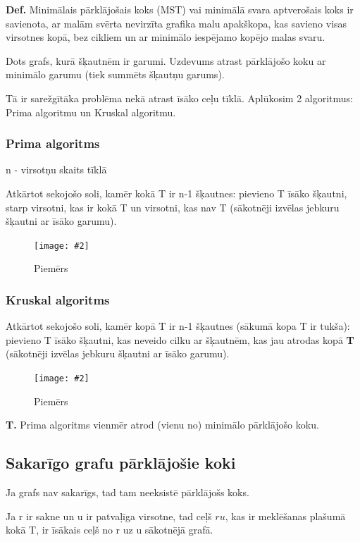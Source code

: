 \documentclass{article}
\newcommand{\illustration}[3]{
	\begin{figure}[H]
		\centering	
		\texttt{[image: \#2]}
		\caption{#3}
	\end{figure}
}
\begin{document}
\textbf{Def.} Minimālais pārklājošais koks (MST) vai minimālā svara aptverošais koks ir savienota, ar malām svērta nevirzīta grafika malu apakškopa, kas savieno visas virsotnes kopā, bez cikliem un ar minimālo iespējamo kopējo malas svaru.

Dots grafs, kurā šķautnēm ir garumi. Uzdevums atrast pārklājošo koku ar minimālo garumu (tiek summēts šķautņu garums).

Tā ir sarežgītāka problēma nekā atrast īsāko ceļu tīklā. Aplūkosim 2 algoritmus: Prima algoritmu un Kruskal algoritmu.

\subsubsection{Prima algoritms}
n - virsotņu skaits tīklā

Atkārtot sekojošo soli, kamēr kokā T ir n-1 šķautnes: pievieno T īsāko šķautni, starp virsotni, kas ir kokā T un virsotni, kas nav T (sākotnēji izvēlas jebkuru šķautni ar īsāko garumu).

\illustration{1}{prima-1}{Piemērs}

\subsubsection{Kruskal algoritms}

Atkārtot sekojošo soli, kamēr kopā T ir n-1 šķautnes (sākumā kopa T ir tukša): pievieno T īsāko šķautni, kas neveido cilku ar šķautnēm, kas jau atrodas kopā \textbf{T  }(sākotnēji izvēlas jebkuru šķautni ar īsāko garumu).

\illustration{1}{kruskal-1}{Piemērs}

\textbf{T. } Prima algoritms vienmēr atrod (vienu no) minimālo pārklājošo koku.

\subsection{Sakarīgo grafu pārklājošie koki}

Ja grafs nav sakarīgs, tad tam neeksistē pārklājošs koks.

Ja r ir sakne un u ir patvaļīga virsotne, tad ceļš $ru$, kas ir meklēšanas plašumā kokā T, ir īsākais ceļš no r uz u sākotnējā grafā.
\end{document}
